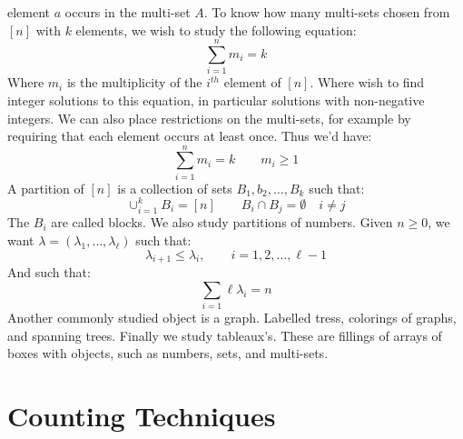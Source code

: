 \documentclass[crop=false,class=book,oneside]{standalone}
\begin{document}
        element $a$ occurs in the multi-set $A$. To know how
        many multi-sets chosen from $[n]$ with $k$ elements,
        we wish to study the following equation:
        \begin{equation}
            \sum_{i=1}^{n}m_{i}=k
        \end{equation}
        Where $m_{i}$ is the multiplicity of the $i^{th}$
        element of $[n]$. Where wish to find integer solutions
        to this equation, in particular solutions with
        non-negative integers. We can also place restrictions
        on the multi-sets, for example by requiring that
        each element occurs at least once. Thus we'd have:
        \begin{equation}
            \sum_{i=1}^{n}m_{i}=k
            \quad\quad
            m_{i}\geq{1}
        \end{equation}
        A partition of $[n]$ is a collection of sets
        $B_{1},b_{2},\dots,B_{k}$ such that:
        \begin{equation}
            \cup_{i=1}^{k}B_{i}=[n]
            \quad\quad
            B_{i}\cap{B}_{j}=\emptyset
            \quad{i}\ne{j}
        \end{equation}
        The $B_{i}$ are called \textrm{blocks}. We also
        study partitions of numbers. Given $n\geq{0}$, we
        want $\lambda=(\lambda_{1},\dots,\lambda_{\ell})$ such
        that:
        \begin{equation}
            \lambda_{i+1}\leq\lambda_{i},
            \quad\quad
            i=1,2,\dots,\ell-1
        \end{equation}
        And such that:
        \begin{equation}
            \sum_{i=1}{\ell}\lambda_{i}=n
        \end{equation}
        Another commonly studied object is a graph. Labelled
        tress, colorings of graphs, and spanning trees. Finally
        we study tableaux's. These are fillings of arrays
        of boxes with objects, such as numbers, sets, and
        multi-sets.
    \section{Counting Techniques}
\end{document}
